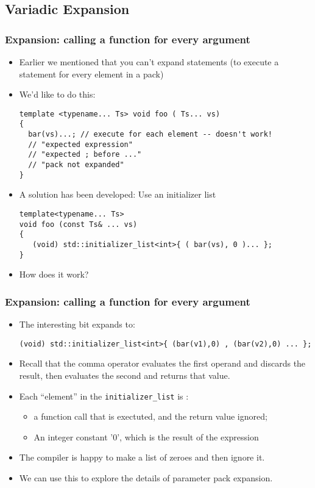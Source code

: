 \subsection{Variadic Expansion}
\begin{frame}[fragile,t]
\frametitle{Expansion: calling a function for every argument}
\begin{itemize}[<+->]
\item Earlier we mentioned that you can't expand statements (to execute a statement for every element in a pack)
\item We'd like to do this:
{\scriptsize\begin{verbatim}
template <typename... Ts> void foo ( Ts... vs)
{
  bar(vs)...; // execute for each element -- doesn't work!
  // "expected expression"
  // "expected ; before ..."
  // "pack not expanded"
}
\end{verbatim}
}
\item A solution has been developed:  Use an initializer list
{\scriptsize\begin{verbatim}
template<typename... Ts>
void foo (const Ts& ... vs)
{
   (void) std::initializer_list<int>{ ( bar(vs), 0 )... };
}
\end{verbatim}
}
\item How does it work?
\end{itemize}
\end{frame}


\begin{frame}[fragile,t]
\frametitle{Expansion: calling a function for every argument}
\begin{itemize}[<+->]
\item The interesting bit expands to:
{\scriptsize\begin{verbatim}
(void) std::initializer_list<int>{ (bar(v1),0) , (bar(v2),0) ... };
\end{verbatim}
}
\item Recall that the comma operator evaluates the first operand and
  discards the result, then evaluates the second and returns that
  value.
\item Each ``element'' in the \texttt{initializer\_list} is :
\begin{itemize}
  \item a function call that is exectuted, and the return value
    ignored;
  \item An integer constant '0', which is the result of the expression
\end{itemize}
\item The compiler is happy to make a list of zeroes and then ignore it.
\vskip 12pt
\item We can use this to explore the details of parameter pack expansion.

\end{itemize}
\end{frame}


